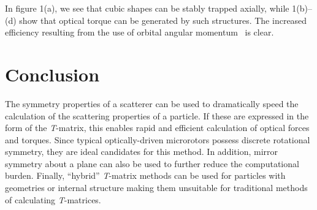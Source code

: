 \documentclass{article}
\begin{document}
In figure 1(a), we see that cubic shapes can be stably trapped axially,
while 1(b)--(d) show that optical torque can be generated by such
structures. The increased efficiency resulting from the use of 
orbital angular momentum~\cite{nieminen2004d} is clear.

\section{Conclusion}

The symmetry properties of a scatterer can be used to dramatically speed
the calculation of the scattering properties of a particle. If these
are expressed in the form of the \textit{T}-matrix, this enables rapid and
efficient calculation of optical forces and torques. Since typical
optically-driven microrotors possess discrete rotational symmetry, they are
ideal candidates for this method. In addition, mirror symmetry about
a plane can also be used to further reduce the computational burden.
Finally, ``hybrid'' \textit{T}-matrix methods can be used for particles
with geometries or internal structure making them unsuitable for
traditional methods of calculating \textit{T}-matrices.
\end{document}
